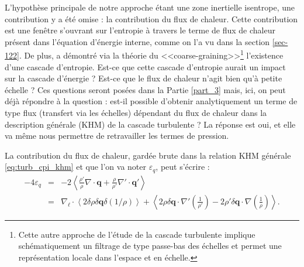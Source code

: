 L'hypothèse principale de notre approche étant une zone inertielle isentrope, une contribution y a été omise : la contribution du flux de chaleur. Cette contribution est une fenêtre s'ouvrant sur l'entropie à travers le terme de flux de chaleur présent dans l'équation d'énergie interne, comme on l'a vu dans la section \ref{sec-122}. De plus, \cite{eyink_cascades_2018} a démontré via la théorie du <<coarse-graining>>\footnote{Cette autre approche de l'étude de la cascade turbulente implique schématiquement un filtrage de type passe-bas des échelles et permet une représentation locale dans l'espace et en échelle.} l'existence d'une cascade d'entropie. Est-ce que cette cascade d'entropie aurait un impact sur la cascade d'énergie ? Est-ce que le flux de chaleur n'agit bien qu'à petite échelle ? Ces questions seront posées dans la Partie \ref{part_3} mais, ici, on peut déjà répondre à la question : est-il possible d'obtenir analytiquement un terme de type flux (transfert via les échelles) dépendant du flux de chaleur dans la description générale (\acs{KHM}) de la cascade turbulente ? La réponse est oui, et elle va même nous permettre de retravailler les termes de pression. 

La contribution du flux de chaleur, gardée brute dans la relation \acs{KHM} générale \eqref{eq:turb_cpi_khm} et que l'on va noter $\varepsilon_{q}$, peut s'écrire :
    \begin{eqnarray*}
    \label{eq:turb_ref_q}    - 4\varepsilon_{q}  &=& - 2 \left<\frac{\rho'}{\rho} \nabla \cdot \boldsymbol{q} + \frac{\rho}{\rho'} \nabla' \cdot \boldsymbol{q'}\right>\\
        &=&\nabla_{\boldsymbol{\ell}} \cdot \left<2\delta \rho \delta \boldsymbol{q}\delta \left(1/\rho\right) \right> + \left< 2\rho  \delta \boldsymbol{q} \cdot \nabla'\left(\frac{1}{\rho'}\right) -  2\rho' \delta \boldsymbol{q} \cdot \nabla \left(\frac{1}{\rho}\right)\right> .
    \end{eqnarray*}

